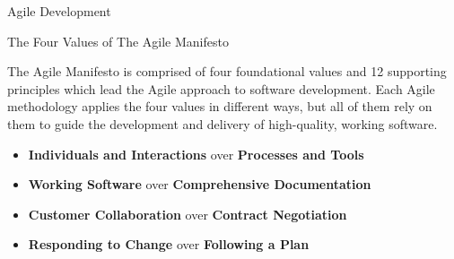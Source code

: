 \documentclass[final,hyperref={pdfpagelabels=false}]{beamer}
\begin{document}
  \begin{frame}{Agile Development}
  \begin{block}{\large The Four Values of The Agile Manifesto}

        The Agile Manifesto is comprised of four foundational values and 12 supporting principles which lead the Agile approach to software development. Each Agile methodology applies the four values in different ways, but all of them rely on them to guide the development and delivery of high-quality, working software.
        \begin{itemize}
            \item \textbf{Individuals and Interactions} over \textbf{Processes and Tools}
            
            \item \textbf{Working Software} over \textbf{Comprehensive Documentation}
            
            \item \textbf{Customer Collaboration} over \textbf{Contract Negotiation}
            
            
            \item \textbf{Responding to Change} over \textbf{Following a Plan }
            

\end{itemize}
\end{block}
\end{frame}
\end{document}
